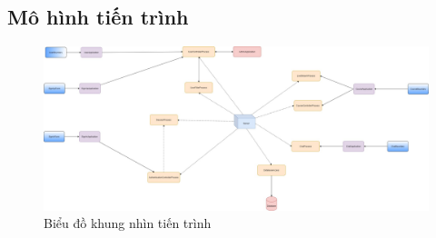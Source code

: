 \documentclass[./../main_file.tex]{subfiles}
\begin{document}
	\subsection{Mô hình tiến trình}
	\begin{figure}[H]
		\centering
		\includegraphics[width=\textwidth]{./images/processview.png}
		\caption{Biểu đồ khung nhìn tiến trình}
	\end{figure}
\end{document}

